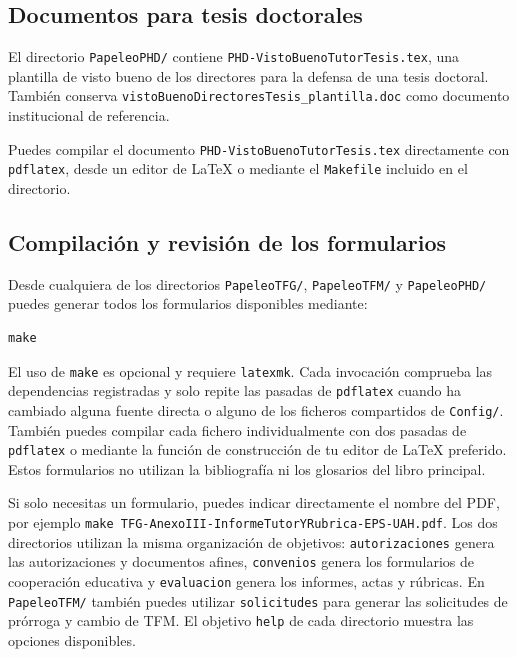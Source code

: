 \subsection{Documentos para tesis doctorales}

El directorio \texttt{PapeleoPHD/} contiene \texttt{PHD-VistoBuenoTutorTesis.tex}, una plantilla de visto bueno de los directores para la defensa de una tesis doctoral. También conserva \texttt{vistoBuenoDirectoresTesis\_plantilla.doc} como documento institucional de referencia.

Puedes compilar el documento \texttt{PHD-VistoBuenoTutorTesis.tex} directamente con \texttt{pdflatex}, desde un editor de \LaTeX{} o mediante el \texttt{Makefile} incluido en el directorio.

\subsection{Compilación y revisión de los formularios}

Desde cualquiera de los directorios \texttt{PapeleoTFG/}, \texttt{PapeleoTFM/} y \texttt{PapeleoPHD/} puedes generar todos los formularios disponibles mediante:

\begin{verbatim}
make
\end{verbatim}

El uso de \texttt{make} es opcional y requiere \texttt{latexmk}. Cada invocación comprueba las dependencias registradas y solo repite las pasadas de \texttt{pdflatex} cuando ha cambiado alguna fuente directa o alguno de los ficheros compartidos de \texttt{Config/}. También puedes compilar cada fichero individualmente con dos pasadas de \texttt{pdflatex} o mediante la función de construcción de tu editor de \LaTeX{} preferido. Estos formularios no utilizan la bibliografía ni los glosarios del libro principal.

Si solo necesitas un formulario, puedes indicar directamente el nombre del PDF, por ejemplo \texttt{make TFG-AnexoIII-InformeTutorYRubrica-EPS-UAH.pdf}. Los dos directorios utilizan la misma organización de objetivos: \texttt{autorizaciones} genera las autorizaciones y documentos afines, \texttt{convenios} genera los formularios de cooperación educativa y \texttt{evaluacion} genera los informes, actas y rúbricas. En \texttt{PapeleoTFM/} también puedes utilizar \texttt{solicitudes} para generar las solicitudes de prórroga y cambio de TFM. El objetivo \texttt{help} de cada directorio muestra las opciones disponibles.

